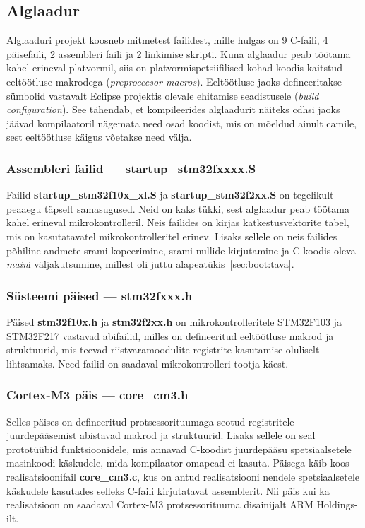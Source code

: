 \documentclass[12pt,a4paper]{article}
\begin{document}
\subsection{Alglaadur}
Alglaaduri projekt koosneb mitmetest failidest, mille hulgas on 9 C-faili, 4
päisefaili, 2 assembleri faili ja 2 linkimise skripti. Kuna alglaadur peab
töötama kahel erineval platvormil, siis on platvormispetsiifilised kohad koodis
kaitstud eeltöötluse makrodega (\textit{preproccesor macros}). Eeltöötluse jaoks
defineeritakse sümbolid vastavalt Eclipse projektis olevale ehitamise
seadistusele (\textit{build configuration}). See tähendab, et kompileerides
alglaadurit näiteks \gls{cdhs}i jaoks jäävad kompilaatoril nägemata need osad
koodist, mis on mõeldud ainult \gls{cam}ile, sest eeltöötluse käigus võetakse
need välja.

\subsubsection{Assembleri failid --- \textbf{startup\_stm32fxxxx.S}}
Failid \textbf{startup\_stm32f10x\_xl.S} ja \textbf{startup\_stm32f2xx.S} on
tegelikult peaaegu täpselt samasugused. Neid on kaks tükki, sest alglaadur peab
töötama kahel erineval mikrokontrolleril. Neis failides on kirjas
katkestusvektorite tabel, mis on kasutatavatel mikrokontrolleritel erinev.
Lisaks sellele on neis failides põhiline andmete \gls{sram}i kopeerimine,
\gls{sram}i nullide kirjutamine ja C-koodis oleva \textit{main}i väljakutsumine,
millest oli juttu alapeatükis~\ref{sec:boot:tava}.

\subsubsection{Süsteemi päised --- \textbf{stm32fxxx.h}}
\label{sec:comp:sysheader}
Päised \textbf{stm32f10x.h} ja \textbf{stm32f2xx.h} on mikrokontrolleritele
STM32F103 ja STM32F217 vastavad abifailid, milles on defineeritud eeltöötluse
makrod ja struktuurid, mis teevad riistvaramoodulite registrite kasutamise
oluliselt lihtsamaks. Need failid on saadaval mikrokontrolleri tootja käest.

\subsubsection{Cortex-M3 päis --- \textbf{core\_cm3.h}}
\label{sec:comp:core}
Selles päises on defineeritud protsessorituumaga seotud registritele
juurdepääsemist abistavad makrod ja struktuurid. Lisaks sellele on seal
prototüübid funktsioonidele, mis annavad C-koodist juurdepääsu spetsiaalsetele
masinkoodi käskudele, mida kompilaator omapead ei kasuta. Päisega käib koos
realisatsioonifail \textbf{core\_cm3.c}, kus on antud realisatsiooni
nendele spetsiaalsetele käskudele kasutades selleks C-faili kirjutatavat
assemblerit. Nii päis kui ka realisatsioon on saadaval Cortex-M3
protsessorituuma disainijalt ARM Holdings-ilt.
\end{document}
